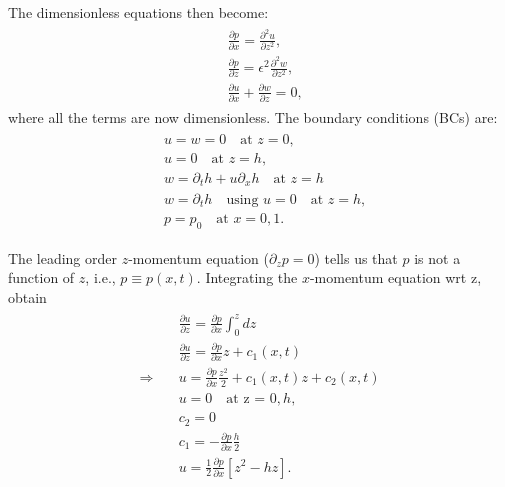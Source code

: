 \documentclass{article}
\begin{document}
The dimensionless equations then become:
\begin{align}\label{eq:thin_film_dimless}
 \begin{split}
  & \frac{\partial p}{\partial x} =\frac{\partial^{2}u}{\partial z^{2}},\\
  & \frac{\partial p}{\partial z} = \epsilon^{2}\frac{\partial^{2}w}{\partial z^{2}},\\
  & \frac{\partial u}{\partial x} + \frac{\partial w}{\partial z} = 0,
 \end{split}
\end{align}
where all the terms are now dimensionless.
The boundary conditions (BCs) are:
\begin{align}\label{eq:thin_film_bcs_dimless}
 \begin{split}
  &u = w = 0 \quad \textrm{at } z = 0, \\
  &u = 0 \quad \textrm{at }z = h, \\
  & w = \partial_{t} h + u \partial_{x}h \quad \textrm{at }z = h\\
  & w = \partial_{t}h  \quad \textrm{using }u = 0 \quad \textrm{at } z = h,\\
  & p = p_{0} \quad \textrm{at }x = 0, 1.
 \end{split}
\end{align}

The leading order $z$-momentum equation ($\partial_{z}p = 0$) tells us that $p$ is not a function of $z$, i.e., $p \equiv p(x, t)$. Integrating the $x$-momentum equation wrt z, obtain 
\begin{align}\label{eq:thin_film_u}
 \begin{split}
  & \frac{\partial u}{\partial z} = \frac{\partial p}{\partial x} \int_{0}^{z} dz \\
  & \frac{\partial u}{\partial z} = \frac{\partial p}{\partial x} z + c_{1}(x, t)\\
  \Rightarrow \quad & u = \frac{\partial p}{\partial x} \frac{z^{2}}{2} + c_{1}(x, t) z + c_{2}(x, t)\\
  & u = 0 \quad \textrm{at z = }0, h, \\
  & c_{2} = 0 \\
  & c_{1} = - \frac{\partial p}{\partial x} \frac{h}{2}\\
  & \boxed{u = \frac{1}{2}\frac{\partial p}{\partial x}\left[z^{2}-hz \right]}.
 \end{split}
\end{align}
\end{document}

